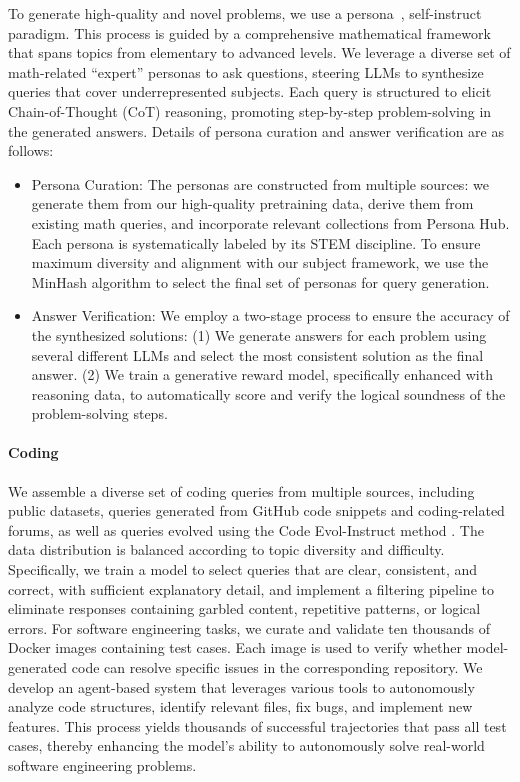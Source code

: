 \documentclass{article}
\begin{document}
To generate high-quality and novel problems, we use a persona~\citep{ge2024scaling}, self-instruct~\citep{wang2022self} paradigm. This process is guided by a comprehensive mathematical framework that spans topics from elementary to advanced levels. We leverage a diverse set of math-related ``expert'' personas to ask questions, steering LLMs to synthesize queries that cover underrepresented subjects. Each query is structured to elicit Chain-of-Thought (CoT) reasoning, promoting step-by-step problem-solving in the generated answers. Details of persona curation and answer verification are as follows:

\begin{itemize}
    \item Persona Curation: The personas are constructed from multiple sources: we generate them from our high-quality pretraining data, derive them from existing math queries, and incorporate relevant collections from Persona Hub. Each persona is systematically labeled by its STEM discipline. To ensure maximum diversity and alignment with our subject framework, we use the MinHash algorithm to select the final set of personas for query generation.
    \item Answer Verification: We employ a two-stage process to ensure the accuracy of the synthesized solutions: (1) We generate answers for each problem using several different LLMs and select the most consistent solution as the final answer. (2) We train a generative reward model, specifically enhanced with reasoning data, to automatically score and verify the logical soundness of the problem-solving steps.
\end{itemize}

\paragraph{Coding}

We assemble a diverse set of coding queries from multiple sources, including public datasets, queries generated from GitHub code snippets \citep{SelfCodeAlign_nips} and coding-related forums, as well as queries evolved using the Code Evol-Instruct method \citep{WizardCoder_iclr}. The data distribution is balanced according to topic diversity and difficulty. Specifically, we train a model to select queries that are clear, consistent, and correct, with sufficient explanatory detail, and implement a filtering pipeline to eliminate responses containing garbled content, repetitive patterns, or logical errors. For software engineering tasks, we curate and validate ten thousands of Docker images containing test cases. Each image is used to verify whether model-generated code can resolve specific issues in the corresponding repository. We develop an agent-based system that leverages various tools to autonomously analyze code structures, identify relevant files, fix bugs, and implement new features. This process yields thousands of successful trajectories that pass all test cases, thereby enhancing the model’s ability to autonomously solve real-world software engineering problems.
\end{document}
